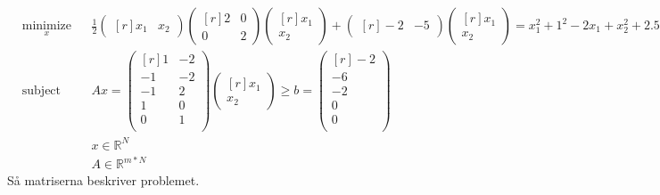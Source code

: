 \begin{equation*}
\begin{aligned}
& \underset{x}{\text{minimize}}
& & 
\frac{1}{2}\begin{pmatrix*}[r]
   x_1  & x_2 
\end{pmatrix*}
\begin{pmatrix*}[r]
  2 & 0 \\
  0 & 2
\end{pmatrix*}
\begin{pmatrix*}[r]
   x_1  \\
   x_2 
\end{pmatrix*}
+
\begin{pmatrix*}[r]
  -2  &
  -5 
\end{pmatrix*}
\begin{pmatrix*}[r]
   x_1  \\
   x_2 
\end{pmatrix*}= x_1^2+1^2-2x_1+x_2^2 +2.5^2-5x_ 2\\
& \text{subject to}
& & Ax =\begin{pmatrix*}[r]
  1 & -2  \\
  -1 & -2  \\
  -1 & 2  \\
  1 & 0  \\
 0 & 1  \\
\end{pmatrix*}
\begin{pmatrix*}[r]
   x_1  \\
   x_2 
\end{pmatrix*}
 \geq b= \begin{pmatrix*}[r]
   -2  \\
   -6  \\
   -2  \\
   0  \\
 0   \\
\end{pmatrix*}\\
& && x \in \mathbb{R}^N \\
& && A \in \mathbb{R}^{m*N}
\end{aligned}
\end{equation*}
Så matriserna beskriver problemet.

